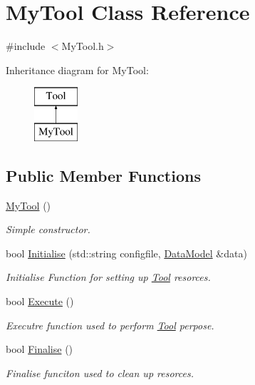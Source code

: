 \hypertarget{classMyTool}{\section{My\-Tool Class Reference}
\label{classMyTool}
}


{\ttfamily \#include $<$My\-Tool.\-h$>$}

Inheritance diagram for My\-Tool\-:\begin{figure}[H]
\begin{center}
\leavevmode
\includegraphics[height=2.000000cm]{classMyTool}
\end{center}
\end{figure}
\subsection*{Public Member Functions}
\begin{DoxyCompactItemize}
\item 
\hypertarget{classMyTool_ad85b796bdd675ae22e69cf40fe7b6314}{\hyperlink{classMyTool_ad85b796bdd675ae22e69cf40fe7b6314}{My\-Tool} ()}\label{classMyTool_ad85b796bdd675ae22e69cf40fe7b6314}

\begin{DoxyCompactList}\small\item\em Simple constructor. \end{DoxyCompactList}\item 
bool \hyperlink{classMyTool_a3bf60061195a18542c4cfb2916b9dad9}{Initialise} (std\-::string configfile, \hyperlink{classDataModel}{Data\-Model} \&data)
\begin{DoxyCompactList}\small\item\em Initialise Function for setting up \hyperlink{classTool}{Tool} resorces. \end{DoxyCompactList}\item 
\hypertarget{classMyTool_a0a58122023af90b9200d0e71e89cfb36}{bool \hyperlink{classMyTool_a0a58122023af90b9200d0e71e89cfb36}{Execute} ()}\label{classMyTool_a0a58122023af90b9200d0e71e89cfb36}

\begin{DoxyCompactList}\small\item\em Executre function used to perform \hyperlink{classTool}{Tool} perpose. \end{DoxyCompactList}\item 
\hypertarget{classMyTool_a060ec6356451aa335d0de41093c9992f}{bool \hyperlink{classMyTool_a060ec6356451aa335d0de41093c9992f}{Finalise} ()}\label{classMyTool_a060ec6356451aa335d0de41093c9992f}

\begin{DoxyCompactList}\small\item\em Finalise funciton used to clean up resorces. \end{DoxyCompactList}\end{DoxyCompactItemize}
